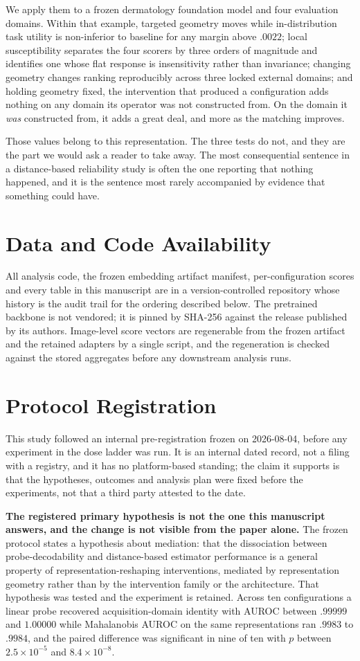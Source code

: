 \documentclass[pdflatex,sn-basic]{sn-jnl}
\theoremstyle{plain}
\theoremstyle{definition}
\theoremstyle{remark}
\begin{document}
We apply them to a frozen dermatology foundation model and four evaluation
domains. Within that example, targeted geometry moves while in-distribution
task utility is non-inferior to baseline for any margin above $.0022$; local
susceptibility separates the four scorers by three orders of magnitude and
identifies one whose flat response is insensitivity rather than invariance;
changing geometry changes ranking reproducibly across three locked external
domains; and holding geometry fixed, the intervention that produced a
configuration adds nothing on any domain its operator was not constructed from.
On the domain it \emph{was} constructed from, it adds a great deal, and more as
the matching improves.

Those values belong to this representation. The three tests do not, and they
are the part we would ask a reader to take away. The most consequential
sentence in a distance-based reliability study is often the one reporting that
nothing happened, and it is the sentence most rarely accompanied by evidence
that something could have.

\section*{Data and Code Availability}
\label{sec:availability}
All analysis code, the frozen embedding artifact manifest, per-configuration
scores and every table in this manuscript are in a version-controlled
repository whose history is the audit trail for the ordering described below.
The pretrained backbone is not vendored; it is pinned by SHA-256 against the
release published by its authors. Image-level score vectors are regenerable
from the frozen artifact and the retained adapters by a single script, and the
regeneration is checked against the stored aggregates before any downstream
analysis runs.

\section*{Protocol Registration}
This study followed an internal pre-registration frozen on 2026-08-04, before
any experiment in the dose ladder was run. It is an internal dated record, not
a filing with a registry, and it has no platform-based standing; the claim it
supports is that the hypotheses, outcomes and analysis plan were fixed before
the experiments, not that a third party attested to the date.

\textbf{The registered primary hypothesis is not the one this manuscript
answers, and the change is not visible from the paper alone.} The frozen
protocol states a hypothesis about mediation: that the dissociation between
probe-decodability and distance-based estimator performance is a general
property of representation-reshaping interventions, mediated by representation
geometry rather than by the intervention family or the architecture. That
hypothesis was tested and the experiment is retained. Across ten
configurations a linear probe recovered acquisition-domain identity with AUROC
between $.99999$ and $1.00000$ while Mahalanobis AUROC on the same
representations ran $.9983$ to $.9984$, and the paired difference was
significant in nine of ten with $p$ between $2.5\times10^{-5}$ and
$8.4\times10^{-8}$.
\end{document}
